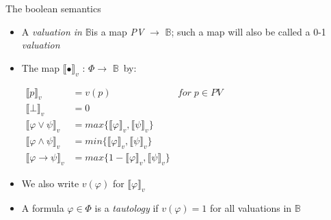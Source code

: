 \documentclass[sans]{beamer}
\begin{document}
\newcommand{\vsem}[1]{\llbracket #1 \rrbracket_v}
\newcommand{\vmsem}[1]{$\llbracket #1 \rrbracket_v$}
\newcommand{\got}[1]{$\mathbb{#1}$}
\newcommand{\gotb}{\got{B}}
\newcommand{\cali}[1]{$\mathcal{#1} \;$}
\newcommand{\calr}{\cali{R}}

\begin{frame}{The boolean semantics}
  \begin{itemize}
    \item A \emph{valuation in} \gotb is a map \emph{PV} $\to$ \gotb;
      such a map will also be called a 0-1 \emph{valuation}

    \vfill

    \item The map \vmsem{\bullet} : $\Phi \to$ \gotb $\,$ by:

      $\begin{aligned}
        \vsem{p} &= v(p) & for \; p \in PV \\
        \vsem{\bot} &= 0 \\
        \vsem{\varphi \vee \psi} &= max\{\vsem{\varphi}, \vsem{\psi}\} \\
        \vsem{\varphi \wedge \psi} &= min\{\vsem{\varphi}, \vsem{\psi}\}\\
        \vsem{\varphi \to \psi} &= max\{1 - \vsem{\varphi}, \vsem{\psi}\}
       \end{aligned}$

    \vfill
    \item We also write $v(\varphi)$ for \vmsem{\varphi}

    \vfill
  \item A formula $\varphi \in \Phi$ is a \emph{tautology} if $v(\varphi) = 1$ for
        all valuations in \gotb
  \end{itemize}
\end{frame}
\end{document}
